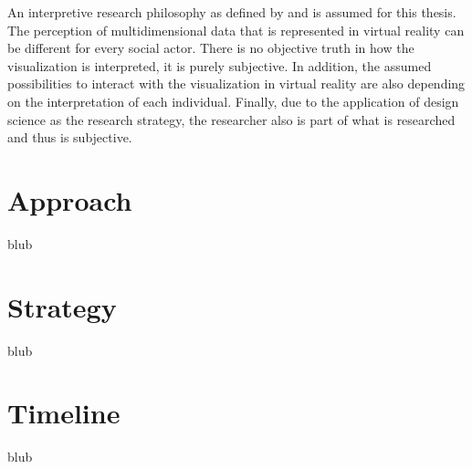 An interpretive research philosophy as defined by \cite{Vaishnavi2007} and \cite{Saunders2009} is assumed for this thesis.
The perception of multidimensional data that is represented in virtual reality can be different for every social actor. There is no objective truth in how the visualization is interpreted, it is purely subjective. In addition, the assumed possibilities to interact with the visualization in virtual reality are also depending on the interpretation of each individual. Finally, due to the application of design science as the research strategy, the researcher also is part of what is researched and thus is subjective.



\section{Approach}

blub



\section{Strategy}

blub



\section{Timeline}

blub





